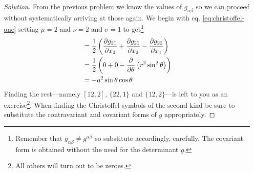 \documentclass{tufte-handout}
\newenvironment{solution}
  {\begin{proof}[Solution]}
  {\end{proof}}
\begin{document}
\begin{solution}
	From the previous problem we know the values of $g_{\alpha\beta}$ so we can proceed without systematically arriving at those again. We begin with eq. \eqref{eq:christoffel-one} setting $\mu = 2$ and $\nu = 2$ and $\sigma = 1$ to get\footnote{Remember that $g_{\alpha\beta} \neq g^{\alpha\beta}$ so substitute accordingly, carefully. The covariant form is obtained without the need for the determinant $g$.}
	\begin{align*}
			[2 2 , 1 ] &= {1\over 2} \left( {\partial g_{2 1}\over \partial x_2} + {\partial g_{2 1}\over \partial x_2} - {\partial g_{2 2}\over \partial x_1} \right) \\
						&= {1\over 2} \left( 0 + 0 - {\partial \over \partial \theta} \left(r^{2}\sin^{2}\theta\right) \right) \\
						&= - a^2 \sin\theta\cos\theta
	\end{align*}
	Finding the rest---namely $[12,2]$, $\{ 22,1 \}$ and $\{ 12,2 \}$---is left to you as an exercise\footnote{All others will turn out to be zeroes.}. When finding the Christoffel symbols of the second kind be sure to substitute the contravariant and covariant forms of $g$ appropriately.

\end{solution}
\end{document}
